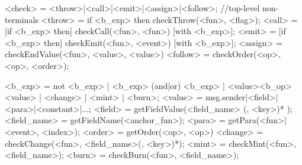 <check> = <throw>|<call>|<emit>|<assign>|<follow>;
//top-level non-terminals
<throw> = if <b_exp> then checkThrow(<fun>, <flag>);
<call> = [if <b_exp> then] checkCall(<fun>, <fun>) [with <b_exp>];
<emit> = [if <b_exp> then] checkEmit(<fun>, <event>) [with <b_exp>];
<assign> = checkEndValue(<fun>, <value>, <value>)
<follow> = checkOrder(<op>, <op>, <order>);

<b_exp> = not <b_exp> | <b_exp> (and|or) <b_exp> | <value><b_op><value> | <change> | <mint> | <burn>;
<value> = msg.sender|<field>|<para>|<constant>|...;
<field> = getFieldValue(<field_name> (, <key>)* );
<field_name> = getFieldName(<anchor_fun>);
<para> = getPara(<fun>|<event>, <index>);
<order> = getOrder(<op>, <op>)
<change> = checkChange(<fun>, <field_name>(, <key>)*);
<mint> = checkMint(<fun>, <field_name>);
<burn> = checkBurn(<fun>, <field_name>);




